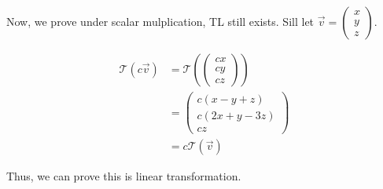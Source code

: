 \documentclass[11pt]{article} %
\begin{document}
\begin{enumerate}
Now, we prove under scalar mulplication, TL still exists. Sill let $\vec{v}=\begin{pmatrix}
	x\\
	y\\
	z
\end{pmatrix}$. 

\begin{align*}
	\mathcal{T}(c\vec{v})&=\mathcal{T}(\begin{pmatrix}
		cx\\
		cy\\
		cz
	\end{pmatrix})\\
&=\begin{pmatrix}
	c(x-y+z)\\
	c(2x+y-3z)\\
	cz
\end{pmatrix}\\
&=c\mathcal{T}(\vec{v})
\end{align*}

Thus, we can prove this is linear transformation.


\end{enumerate}
\end{document}

